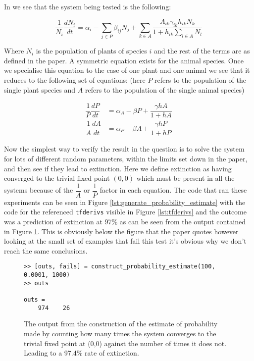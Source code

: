 \documentclass[11pt]{scrreprt}
\begin{document}
\begin{enumerate}
		In \citet{James2012} we see that the system being tested is the following:
		
		$$
		\dfrac{1}{N_i} \dfrac{dN_i}{dt} = \alpha_i - \sum_{j \in P} \beta_{ij}N_j + \sum_{k \in A} \dfrac{A_{ik}\gamma_{ik}h_{ik}N_{k}}{1 + h_{ik}\sum_{l \in A}N_l}
		$$
		
		Where $N_i$ is the population of plants of species $i$ and the rest of the terms are as defined in the paper. A symmetric equation exists for the animal species. Once we specialise this equation to the case of one plant and one animal we see that it reduces to the following set of equations: (here $P$ refers to the population of the single plant species and $A$ refers to the population of the single animal species)
		
		\begin{align*}
		\dfrac{1}{P}\dfrac{dP}{dt} & = \alpha_{A} - \beta P + \dfrac{\gamma hA}{1 + hA} \\
		\dfrac{1}{A}\dfrac{dA}{dt} & = \alpha_{P} - \beta A + \dfrac{\gamma hP}{1 + hP} 
		\end{align*}
		
		Now the simplest way to verify the result in the question is to solve the system for lots of different random parameters, within the limits set down in the paper, and then see if they lead to extinction. Here we define extinction as having converged to the trivial fixed point $(0,0)$ which must be present in all the systems because of the $\dfrac{1}{A}$ or $\dfrac{1}{P}$ factor in each equation. The code that ran these experiments can be seen in Figure \ref{lst:generate_probability_estimate} with the code for the referenced \texttt{tfderivs} visible in Figure \ref{lst:tfderivs} and the outcome was a prediction of extinction at 97\% as can be seen from the output contained in Figure \ref{fig:estimate_probability}. This is obviously below the figure that the paper quotes however looking at the small set of examples that fail this test it's obvious why we don't reach the same conclusions.
		
		\begin{figure}[ht]
			\begin{framed}
				\begin{verbatim}
>> [outs, fails] = construct_probability_estimate(100, 0.0001, 1000)
>> outs
				
outs =
	974    26
				\end{verbatim}
			\end{framed}
			\caption{The output from the construction of the estimate of probability made by counting how many times the system converges to the trivial fixed point at (0,0) against the number of times it does not. Leading to a 97.4\% rate of extinction.}
			\label{fig:estimate_probability}
		\end{figure}
		

\end{enumerate}
\end{document}
